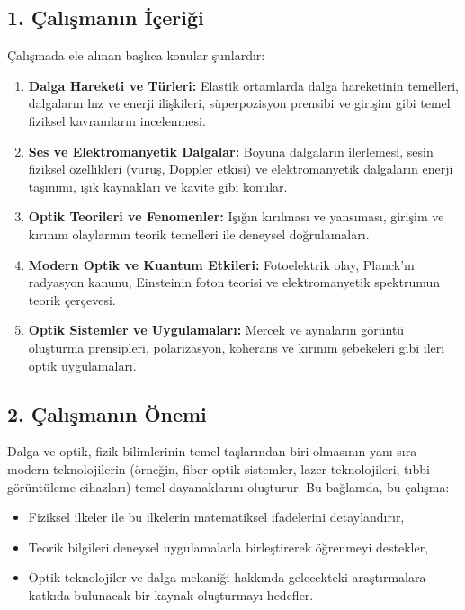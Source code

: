 \documentclass[11pt,letterpaper,twocolumn]{fenbil}
\begin{document}
\begin{@twocolumnfalse}
\begin{center}
\subsection*{1. Çalışmanın İçeriği}
\justifying
Çalışmada ele alınan başlıca konular şunlardır:
\begin{enumerate}[label=\textbf{\arabic*.},leftmargin=1cm]
    \item \textbf{Dalga Hareketi ve Türleri:} Elastik ortamlarda dalga hareketinin temelleri, dalgaların hız ve enerji ilişkileri, süperpozisyon prensibi ve girişim gibi temel fiziksel kavramların incelenmesi.
    \item \textbf{Ses ve Elektromanyetik Dalgalar:} Boyuna dalgaların ilerlemesi, sesin fiziksel özellikleri (vuruş, Doppler etkisi) ve elektromanyetik dalgaların enerji taşınımı, ışık kaynakları ve kavite gibi konular.
    \item \textbf{Optik Teorileri ve Fenomenler:} Işığın kırılması ve yansıması, girişim ve kırınım olaylarının teorik temelleri ile deneysel doğrulamaları.
    \item \textbf{Modern Optik ve Kuantum Etkileri:} Fotoelektrik olay, Planck’ın radyasyon kanunu, Einsteinin foton teorisi ve elektromanyetik spektrumun teorik çerçevesi.
    \item \textbf{Optik Sistemler ve Uygulamaları:} Mercek ve aynaların görüntü oluşturma prensipleri, polarizasyon, koherans ve kırınım şebekeleri gibi ileri optik uygulamaları.
\end{enumerate}

\subsection*{2. Çalışmanın Önemi}
\justifying
Dalga ve optik, fizik bilimlerinin temel taşlarından biri olmasının yanı sıra modern teknolojilerin (örneğin, fiber optik sistemler, lazer teknolojileri, tıbbi görüntüleme cihazları) temel dayanaklarını oluşturur. Bu bağlamda, bu çalışma:
\begin{itemize}[leftmargin=1cm]
    \item Fiziksel ilkeler ile bu ilkelerin matematiksel ifadelerini detaylandırır,
    \item Teorik bilgileri deneysel uygulamalarla birleştirerek öğrenmeyi destekler,
    \item Optik teknolojiler ve dalga mekaniği hakkında gelecekteki araştırmalara katkıda bulunacak bir kaynak oluşturmayı hedefler.
\end{itemize}


\end{center}
\end{@twocolumnfalse}
\end{document}
